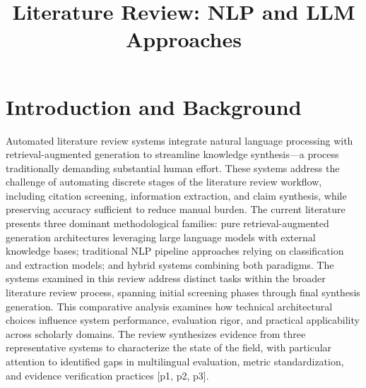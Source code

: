 \documentclass{article}
\title{Literature Review: NLP and LLM Approaches}
\begin{document}
\maketitle
\section{Introduction and Background}
Automated literature review systems integrate natural language processing with retrieval-augmented generation to streamline knowledge synthesis—a process traditionally demanding substantial human effort. These systems address the challenge of automating discrete stages of the literature review workflow, including citation screening, information extraction, and claim synthesis, while preserving accuracy sufficient to reduce manual burden. The current literature presents three dominant methodological families: pure retrieval-augmented generation architectures leveraging large language models with external knowledge bases; traditional NLP pipeline approaches relying on classification and extraction models; and hybrid systems combining both paradigms. The systems examined in this review address distinct tasks within the broader literature review process, spanning initial screening phases through final synthesis generation. This comparative analysis examines how technical architectural choices influence system performance, evaluation rigor, and practical applicability across scholarly domains. The review synthesizes evidence from three representative systems to characterize the state of the field, with particular attention to identified gaps in multilingual evaluation, metric standardization, and evidence verification practices [p1, p2, p3].
\end{document}
